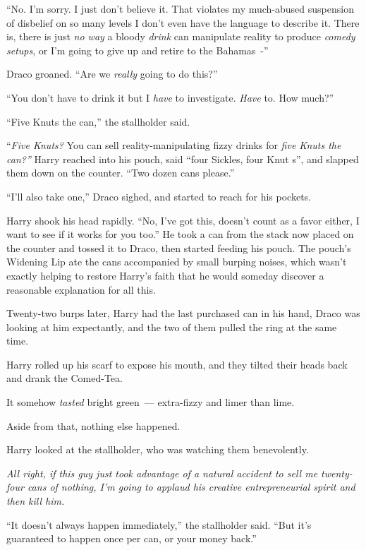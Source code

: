``No. I'm sorry. I just don't believe it. That violates my much-abused suspension of disbelief on so many levels I don't even have the language to describe it. There is, there is just \emph{no way} a bloody \emph{drink} can manipulate reality to produce \emph{comedy setups}, or I'm going to give up and retire to the Bahamas~-''

Draco groaned. ``Are we \emph{really} going to do this?''

``You don't have to drink it but I \emph{have} to investigate. \emph{Have} to. How much?''

``Five Knuts the can,'' the stallholder said.

``\emph{Five Knuts?} You can sell reality-manipulating fizzy drinks for \emph{five Knuts the can?''} Harry reached into his pouch, said ``four Sickles, four Knut s'', and slapped them down on the counter. ``Two dozen cans please.''

``I'll also take one,'' Draco sighed, and started to reach for his pockets.

Harry shook his head rapidly. ``No, I've got this, doesn't count as a favor either, I want to see if it works for you too.'' He took a can from the stack now placed on the counter and tossed it to Draco, then started feeding his pouch. The pouch's Widening Lip ate the cans accompanied by small burping noises, which wasn't exactly helping to restore Harry's faith that he would someday discover a reasonable explanation for all this.

Twenty-two burps later, Harry had the last purchased can in his hand, Draco was looking at him expectantly, and the two of them pulled the ring at the same time.

Harry rolled up his scarf to expose his mouth, and they tilted their heads back and drank the Comed-Tea.

It somehow \emph{tasted} bright green~--- extra-fizzy and limer than lime.

Aside from that, nothing else happened.

Harry looked at the stallholder, who was watching them benevolently.

\emph{All right, if this guy just took advantage of a natural accident to sell me twenty-four cans of nothing}\emph{, I'm going to applaud his creative entrepreneurial spirit and then kill him.}

``It doesn't always happen immediately,'' the stallholder said. ``But it's guaranteed to happen once per can, or your money back.''

